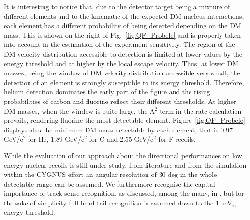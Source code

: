 \documentclass[physics,article,submit,moreauthors,pdftex]{Definitions/mdpi}
\begin{document}
It is interesting to notice that, due to the detector target being a mixture of different elements and to the kinematic of the expected DM-nucleus interactions, each element has a different probability of being detected depending on the DM mass. 
This is shown on the right of Fig.~\ref{fig:QF_Probele} and is properly taken into account in the estimation of the experiment sensitivity. The region of the DM velocity distribution accessible to detection is limited at lower values by the energy threshold and at higher by the local escape velocity. Thus, at lower DM masses, being the window of DM velocity distribution accessible very small, the detection of an element is strongly susceptible to its energy threshold. Therefore, helium detection dominates the early part of the figure and the rising probabilities of carbon and fluorine reflect their different thresholds. At higher DM masses, when  the window is quite large, the A$^2$ term in the rate calculation prevails, rendering fluorine the most detectable element. Figure~\ref{fig:QF_Probele} displays also the minimum DM mass detectable by each element, that is 0.97 GeV/c$^2$ for He, 1.89 GeV/c$^2$ for C and 2.55 GeV/c$^2$ for F recoils.


 
 While the evaluation of our approach about the directional performances on low energy nuclear recoils is still under study, from literature \cite{Nakamura:2012zza} and from the simulation within the CYGNUS effort \cite{Vahsen:2020pzb} an angular 
resolution of 30 deg in the whole 
detectable range can be assumed.
We furthermore recognise the capital importance of track sense recognition, as discussed, among the many, in \cite{Mayet:2016zxu, Vahsen:2020pzb}, but for the sake of simplicity full head-tail recognition is assumed down to the 1 keV$_{ee}$ energy threshold.
 
\end{document}
